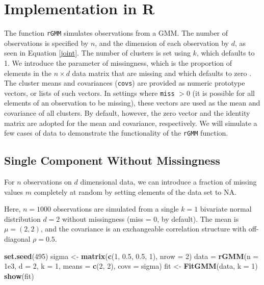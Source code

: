 \documentclass[12pt]{article}
\newenvironment{Shaded}{\begin{snugshade}}{\end{snugshade}}
\newcommand{\AttributeTok}[1]{\textcolor[rgb]{0.13,0.29,0.53}{#1}}
\newcommand{\DecValTok}[1]{\textcolor[rgb]{0.00,0.00,0.81}{#1}}
\newcommand{\FloatTok}[1]{\textcolor[rgb]{0.00,0.00,0.81}{#1}}
\newcommand{\FunctionTok}[1]{\textcolor[rgb]{0.13,0.29,0.53}{\textbf{#1}}}
\newcommand{\NormalTok}[1]{#1}
\newcommand{\OtherTok}[1]{\textcolor[rgb]{0.56,0.35,0.01}{#1}}
\begin{document}
\hypertarget{implementation-in-r}{%
\section{Implementation in R}\label{implementation-in-r}}

The function \texttt{rGMM} simulates observations from a GMM. The number
of observations is specified by \(n\), and the dimension of each
observation by \(d\), as seen in Equation \ref{joint}. The number of
clusters is set using \(k\), which defaults to 1. We introduce the
parameter of missingness, which is the proportion of elements in the
\(n \times d\) data matrix that are missing and which defaults to zero
\citep{McCaw2019.12.20.884551}. The cluster means and covariances
(\texttt{covs}) are provided as numeric prototype vectors, or lists of
such vectors. In settings where \texttt{miss} \(> 0\) (it is possible
for all elements of an observation to be missing), these vectors are
used as the mean and covariance of all clusters. By default, however,
the zero vector and the identity matrix are adopted for the mean and
covariance, respectively. We will simulate a few cases of data to
demonstrate the functionality of the \texttt{rGMM} function.

\hypertarget{single-component-without-missingness}{%
\subsection{Single Component Without
Missingness}\label{single-component-without-missingness}}

For \(n\) observations on \(d\) dimensional data, we can introduce a
fraction of missing values \(m\) completely at random by setting
elements of the data set to NA.

Here, \(n = 1000\) observations are simulated from a single \(k = 1\)
bivariate normal distribution \(d = 2\) without missingness (miss = 0,
by default). The mean is \(\mu = (2, 2)\), and the covariance is an
exchangeable correlation structure with off-diagonal \(\rho = 0.5\).

\begin{Shaded}
\begin{Highlighting}[]
\FunctionTok{set.seed}\NormalTok{(}\DecValTok{495}\NormalTok{)}
\NormalTok{sigma }\OtherTok{\textless{}{-}} \FunctionTok{matrix}\NormalTok{(}\FunctionTok{c}\NormalTok{(}\DecValTok{1}\NormalTok{, }\FloatTok{0.5}\NormalTok{, }\FloatTok{0.5}\NormalTok{, }\DecValTok{1}\NormalTok{), }\AttributeTok{nrow =} \DecValTok{2}\NormalTok{)}
\NormalTok{data }\OtherTok{=} \FunctionTok{rGMM}\NormalTok{(}\AttributeTok{n =} \FloatTok{1e3}\NormalTok{, }\AttributeTok{d =} \DecValTok{2}\NormalTok{, }\AttributeTok{k =} \DecValTok{1}\NormalTok{, }\AttributeTok{means =} \FunctionTok{c}\NormalTok{(}\DecValTok{2}\NormalTok{, }\DecValTok{2}\NormalTok{), }\AttributeTok{covs =}\NormalTok{ sigma)}
\NormalTok{fit }\OtherTok{\textless{}{-}} \FunctionTok{FitGMM}\NormalTok{(data, }\AttributeTok{k =} \DecValTok{1}\NormalTok{)}
\FunctionTok{show}\NormalTok{(fit)}
\end{Highlighting}
\end{Shaded}
\end{document}
